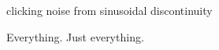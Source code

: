 
\begin{DoxyRefList}
\item[\label{bug__bug000001}%
\hypertarget{bug__bug000001}{}%
File \hyperlink{alsa__test_8cpp}{alsa\+\_\+test.cpp} ]clicking noise from sinusoidal discontinuity  
\item[\label{bug__bug000002}%
\hypertarget{bug__bug000002}{}%
File \hyperlink{ZDomain_8hpp}{Z\+Domain.hpp} ]Everything. Just everything. 
\end{DoxyRefList}